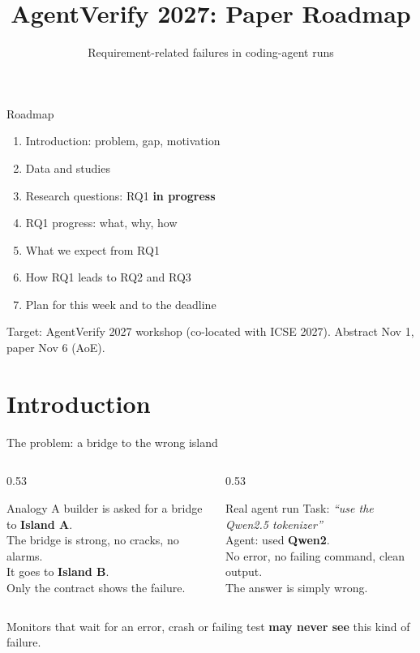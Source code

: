 \documentclass[aspectratio=169,11pt]{beamer}
\title{AgentVerify 2027: Paper Roadmap}
\subtitle{Requirement-related failures in coding-agent runs}
\newcommand{\now}{{\small\color{accentAmber}\textbf{in progress}}}
\newcommand{\fine}[1]{{\scriptsize\color{gray}#1}}
\begin{document}
\maketitle
{}

\begin{frame}{Roadmap}
  \begin{enumerate}
    \item Introduction: problem, gap, motivation
    \item Data and studies
    \item Research questions:  {\small RQ1 \now}
    \item RQ1 progress: what, why, how
    \item What we expect from RQ1
    \item How RQ1 leads to RQ2 and RQ3
    \item Plan for this week and to the deadline
  \end{enumerate}
  \vfill
  \fine{Target: AgentVerify 2027 workshop (co-located with ICSE 2027). Abstract Nov 1, paper Nov 6 (AoE).}
\end{frame}

\section{Introduction}

\begin{frame}{The problem: a bridge to the wrong island}
  \begin{columns}[T]
    \begin{column}{0.53\textwidth}
      \begin{block}{Analogy}
        A builder is asked for a bridge to \textbf{Island A}.\\
        The bridge is strong, no cracks, no alarms.\\
        It goes to \textbf{Island B}.\\[4pt]
        Only the \alert{contract} shows the failure.
      \end{block}
    \end{column}
    \begin{column}{0.53\textwidth}
      \begin{block}{Real agent run}
        Task: \emph{``use the Qwen2.5 tokenizer''}\\
        Agent: used \textbf{Qwen2}.\\
        No error, no failing command, clean output.\\[4pt]
        The answer is simply \alert{wrong}.
      \end{block}
    \end{column}
  \end{columns}
  \vfill
  \centering Monitors that wait for an error, crash or failing test \textbf{may never see} this kind of failure.
\end{frame}
\end{document}

